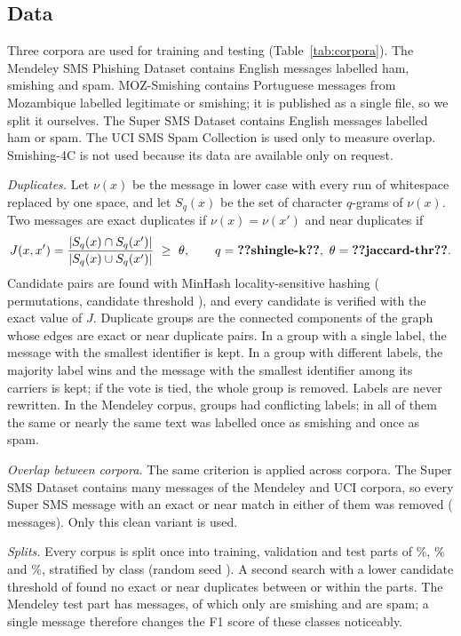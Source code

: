 \subsection{Data}\label{sec:data}

Three corpora are used for training and testing (Table~\ref{tab:corpora}). The Mendeley SMS Phishing Dataset \cite{mendeley2022,mishra2023dataset} contains English messages labelled ham, smishing and spam. MOZ-Smishing \cite{moz2025} contains Portuguese messages from Mozambique labelled legitimate or smishing; it is published as a single file, so we split it ourselves. The Super SMS Dataset \cite{salman2024} contains English messages labelled ham or spam. The UCI SMS Spam Collection \cite{almeida2011} is used only to measure overlap. Smishing-4C \cite{smishing4c2024} is not used because its data are available only on request.

\emph{Duplicates.} Let $\nu(x)$ be the message in lower case with every run of whitespace replaced by one space, and let $S_q(x)$ be the set of character $q$-grams of $\nu(x)$. Two messages are exact duplicates if $\nu(x)=\nu(x')$ and near duplicates if
\begin{equation}\label{eq:jaccard}
J(x,x')=\frac{|S_q(x)\cap S_q(x')|}{|S_q(x)\cup S_q(x')|}\ \ge\ \theta,\qquad q=\val{shingle-k},\ \theta=\val{jaccard-thr}.
\end{equation}
Candidate pairs are found with MinHash locality-sensitive hashing \cite{broder1997} ( permutations, candidate threshold ), and every candidate is verified with the exact value of $J$. Duplicate groups are the connected components of the graph whose edges are exact or near duplicate pairs. In a group with a single label, the message with the smallest identifier is kept. In a group with different labels, the majority label wins and the message with the smallest identifier among its carriers is kept; if the vote is tied, the whole group is removed. Labels are never rewritten. In the Mendeley corpus,  groups had conflicting labels; in all of them the same or nearly the same text was labelled once as smishing and once as spam.

\emph{Overlap between corpora.} The same criterion is applied across corpora. The Super SMS Dataset contains many messages of the Mendeley and UCI corpora, so every Super SMS message with an exact or near match in either of them was removed ( messages). Only this clean variant is used.

\emph{Splits.} Every corpus is split once into training, validation and test parts of \%, \% and \%, stratified by class (random seed ). A second search with a lower candidate threshold of  found no exact or near duplicates between or within the parts. The Mendeley test part has  messages, of which only  are smishing and  are spam; a single message therefore changes the F1 score of these classes noticeably.


